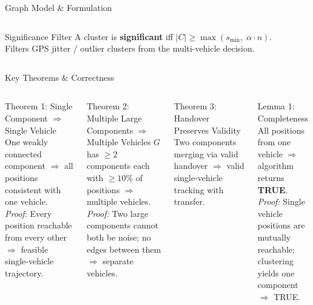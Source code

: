 \documentclass[aspectratio=169,xcolor=dvipsnames,9pt]{beamer}
\begin{document}
\begin{frame}{Graph Model \& Formulation}
\begin{columns}[T]
        \vspace{0.2em}
        \begin{block}{Significance Filter}
            \footnotesize
            A cluster is \textbf{significant} iff $|C| \geq \max(s_{\min},\; \alpha \cdot n)$.\\
            Filters GPS jitter / outlier clusters from the multi-vehicle decision.
        \end{block}
    \end{columns}
\end{frame}

\begin{frame}{Key Theorems \& Correctness}
    \footnotesize
    \begin{columns}[T]
        \begin{block}{Theorem 1: Single Component $\Rightarrow$ Single Vehicle}
            \footnotesize One weakly connected component $\Rightarrow$ all positions consistent with one vehicle.\\
            {\scriptsize\textit{Proof:} Every position reachable from every other $\Rightarrow$ feasible single-vehicle trajectory.}
        \end{block}

        \vspace{0.15em}
        \begin{alertblock}{Theorem 2: Multiple Large Components $\Rightarrow$ Multiple Vehicles}
            \footnotesize $G$ has $\geq 2$ components each with $\geq 10\%$ of positions $\Rightarrow$ multiple vehicles.\\
            {\scriptsize\textit{Proof:} Two large components cannot both be noise; no edges between them $\Rightarrow$ separate vehicles.}
        \end{alertblock}

        \vspace{0.15em}
        \begin{block}{Theorem 3: Handover Preserves Validity}
            \footnotesize Two components merging via valid handover $\Rightarrow$ valid single-vehicle tracking with transfer.
        \end{block}

        \begin{block}{Lemma 1: Completeness}
            \footnotesize All positions from one vehicle $\Rightarrow$ algorithm returns \textbf{TRUE}.\\
            {\scriptsize\textit{Proof:} Single vehicle positions are mutually reachable; clustering yields one component $\Rightarrow$ TRUE.}
        \end{block}


\end{columns}
\end{frame}
\end{document}

